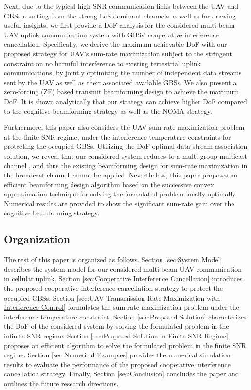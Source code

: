 \documentclass[onecolumn, draftclsnofoot, 12pt]{IEEEtran}
\begin{document}
Next, due to the typical high-SNR communication links between the UAV and GBSs resulting from the strong LoS-dominant channels as well as for drawing useful insights, we first provide a DoF analysis for the considered multi-beam UAV uplink communication system with GBSs' cooperative interference cancellation. Specifically, we derive the maximum achievable DoF with our proposed strategy for UAV's sum-rate maximization subject to the stringent constraint on no harmful interference to existing terrestrial uplink communications, by jointly optimizing the number of independent data streams sent by the UAV as well as their associated available GBSs. We also present a zero-forcing (ZF) based transmit beamforming design to achieve the maximum DoF. It is shown analytically that our strategy can achieve higher DoF compared to the cognitive beamforming strategy as well as the NOMA strategy.

Furthermore, this paper also considers the UAV sum-rate maximization problem at the finite SNR regime, under the interference temperature constraints for protecting the occupied GBSs. Utilizing the DoF-optimal data stream association solution, we reveal that our considered system reduces to a multi-group multicast channel \cite{multicasting}, and thus the existing beamforming design for sum-rate maximization in the broadcast channel \cite{WMMSE,optimality} cannot be applied. Nevertheless, this paper proposes an efficient beamforming design algorithm based on the successive convex approximation technique for solving the formulated problem locally optimally. Numerical results are provided to show the significant sum-rate gain over the cognitive beamforming strategy.

\subsection{Organization}
The rest of this paper is organized as follows.
Section \ref{sec:System Model} describes the system model for our considered multi-beam UAV communication in cellular uplink.
Section \ref{sec:Cooperative Interference Cancellation} introduces the proposed cooperative interference cancellation strategy to protect the occupied GBSs.
Section \ref{sec:UAV Transmission Rate Maximization with Interference Control} formulates the sum-rate maximization problem under the interference temperature constraint.
Section \ref{sec:Proposed Solution} characterizes the DoF of the considered system by solving the formulated problem in the infinite SNR regime.
Section \ref{sec:Proposed Solution in Finite SNR Regime} proposes an efficient algorithm to solve the formulated problem in the finite SNR regime. Section \ref{sec:Numerical Examples} provides the numerical simulation results to evaluate the performance of the proposed cooperative interference cancellation strategy. Finally, Section \ref{sec:Conclusion} concludes the paper and outlines the future research directions.
\end{document}
